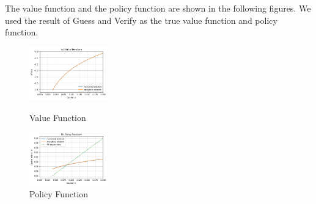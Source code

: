 \documentclass{ltjsarticle}
\begin{document}
The value function and the policy function are shown in the following figures. We used the result of Guess and Verify as the true value function and policy function.
\begin{figure}[H]
    \centering
    \begin{minipage}[b]{\textwidth}
        \centering
        \includegraphics[width=0.3\textwidth]{Q2_VF.png}
        \caption{Value Function}
        \label{fig:value_function}
    \end{minipage}
    \begin{minipage}[b]{\textwidth}
        \centering
        \includegraphics[width=0.3\textwidth]{Q2_PF.png}
        \caption{Policy Function}
        \label{fig:policy_function}
    \end{minipage}
    \label{fig:value_and_policy_functions}
\end{figure}
\end{document}
